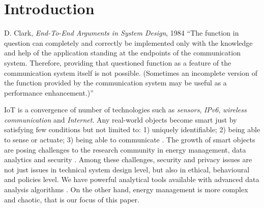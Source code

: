 \chapter{Introduction}

\begin{chapquote}{D. Clark,  \textit{End-To-End Arguments in System Design}, 1984}
	``The function in question can completely and correctly be implemented only with
	the knowledge and help of the application standing at the endpoints of the
	communication system. Therefore, providing that questioned function as a feature
	of the communication system itself is not possible. (Sometimes an incomplete
	version of the function provided by the communication system may be useful as a
	performance enhancement.)'' 
\end{chapquote}


IoT is a convergence of number of technologies such as \textit{sensors}, \textit{IPv6}, \textit{wireless communication} and  \textit{Internet}. Any real-world objects become smart just by satisfying few conditions but not limited to: 1) uniquely identifiable;  2) being able to sense or actuate; 3) being able to communicate \cite{IoT:Defn}. The growth of smart objects are posing challenges to the research community in energy management, data analytics and security \cite{IoT:Challenge}. Among these challenges, security and privacy issues are not just issues in technical system design level, but also in ethical, behavioural and policies level. We have powerful analytical tools available with advanced data analysis algorithms \cite{BigD:Deep}. On the other hand, energy management is more complex and chaotic, that is our focus of this paper. 

